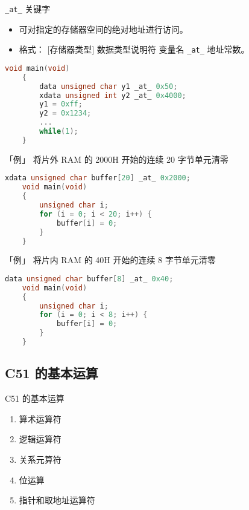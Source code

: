 \documentclass{beamer}
\begin{document}
\begin{frame}[fragile]{\texttt{\_at\_} 关键字}
    \begin{itemize}

        \item
            可对指定的存储器空间的绝对地址进行访问。
        \item
            格式： {[}存储器类型{]} 数据类型说明符 变量名 \texttt{\_at\_}
            地址常数。
    \end{itemize}

    \pause
    \begin{lstlisting}[language=C]
    void main(void)
    {
        data unsigned char y1 _at_ 0x50;
        xdata unsigned int y2 _at_ 0x4000;
        y1 = 0xff;
        y2 = 0x1234;
        ...
        while(1);
    }
    \end{lstlisting}
\end{frame}

\begin{frame}[fragile]{「例」 将片外 RAM 的 2000H 开始的连续 20 字节单元清零}
    \pause
    \begin{lstlisting}[language=C]
    xdata unsigned char buffer[20] _at_ 0x2000;
    void main(void)
    {
        unsigned char i;
        for (i = 0; i < 20; i++) {
            buffer[i] = 0;
        }
    }
    \end{lstlisting}
\end{frame}

\begin{frame}[fragile]{「例」 将片内 RAM 的 40H 开始的连续 8 字节单元清零}
    \pause
    \begin{lstlisting}[language=C]
    data unsigned char buffer[8] _at_ 0x40;
    void main(void)
    {
        unsigned char i;
        for (i = 0; i < 8; i++) {
            buffer[i] = 0;
        }
    }
    \end{lstlisting}
\end{frame}

\subsection{C51 的基本运算}

\begin{frame}{C51 的基本运算}
    \begin{enumerate}
        \item
            算术运算符
        \item
            逻辑运算符
        \item
            关系元算符
        \item
            位运算
        \item
            指针和取地址运算符
    \end{enumerate}
\end{frame}
\end{document}
